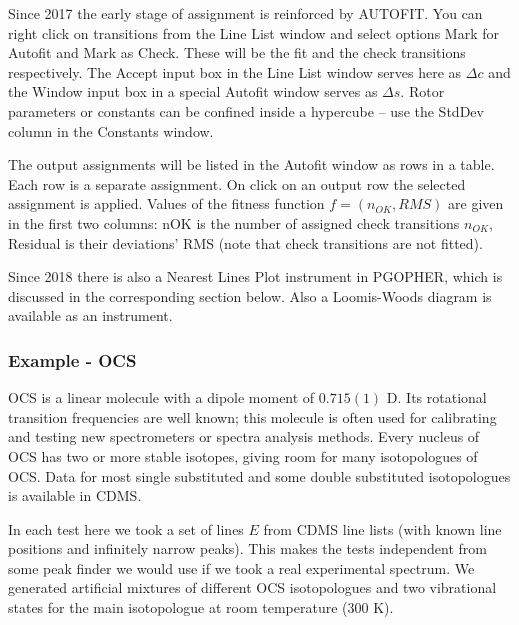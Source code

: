 \documentclass[11pt]{article}
\begin{document}

Since 2017 the early stage of assignment is reinforced by AUTOFIT. You can right click on transitions from the Line List window and select options Mark for Autofit and Mark as Check. These will be the fit and the check transitions respectively. The Accept input box in the Line List window serves here as $\Delta c$ and the Window input box in a special Autofit window serves as $\Delta s$. Rotor parameters or constants can be confined inside a hypercube -- use the StdDev column in the Constants window.

The output assignments will be listed in the Autofit window as rows in a table. Each row is a separate assignment. On click on an output row the selected assignment is applied. Values of the fitness function $f = (n_{OK}, {RMS})$ are given in the first two columns: nOK is the number of assigned check transitions $n_{OK}$, Residual is their deviations' RMS (note that check transitions are not fitted).

Since 2018 there is also a Nearest Lines Plot instrument in PGOPHER, which is discussed in the corresponding section below. Also a Loomis-Woods diagram is available as an instrument.

\subsubsection{Example - OCS}

OCS is a linear molecule with a dipole moment of $0.715(1)$ D. Its rotational transition frequencies are well known; this molecule is often used for calibrating and testing new spectrometers or spectra analysis methods. Every nucleus of OCS has two or more stable isotopes, giving room for many isotopologues of OCS. Data for most single substituted and some double substituted isotopologues is available in CDMS.

In each test here we took a set of lines $E$ from CDMS line lists (with known line positions and infinitely narrow peaks). This makes the tests independent from some peak finder we would use if we took a real experimental spectrum. We generated artificial mixtures of different OCS isotopologues and two vibrational states for the main isotopologue at room temperature (300 K).
\end{document}
